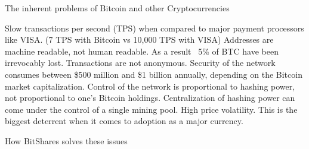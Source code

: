 The inherent problems of Bitcoin and other Cryptocurrencies

    Slow transactions per second (TPS) when compared to major payment processors like VISA. (7 TPS with Bitcoin vs 10,000 TPS with VISA)
    Addresses are machine readable, not human readable. As a result ~5\% of BTC have been irrevocably lost.
    Transactions are not anonymous.
    Security of the network consumes between \$500 million and \$1 billion annually, depending on the Bitcoin market capitalization.
    Control of the network is proportional to hashing power, not proportional to one's Bitcoin holdings.
    Centralization of hashing power can come under the control of a single mining pool.
    High price volatility. This is the biggest deterrent when it comes to adoption as a major currency.

How BitShares solves these issues

